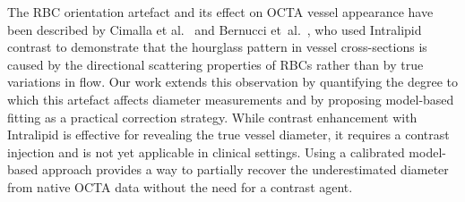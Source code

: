 \documentclass{optica-article}
\begin{document}
The RBC orientation artefact and its effect on OCTA vessel appearance have been described by Cimalla et al.~\cite{cimallaShearFlowinducedOptical2011} and Bernucci et~al.~\cite{bernucciInvestigationArtifactsRetinal2018}, who used Intralipid contrast to demonstrate that the hourglass pattern in vessel cross-sections is caused by the directional scattering properties of RBCs rather than by true variations in flow. Our work extends this observation by quantifying the degree to which this artefact affects diameter measurements and by proposing model-based fitting as a practical correction strategy. While contrast enhancement with Intralipid is effective for revealing the true vessel diameter, it requires a contrast injection and is not yet applicable in clinical settings. Using a calibrated model-based approach provides a way to partially recover the underestimated diameter from native OCTA data without the need for a contrast agent. 
\end{document}
